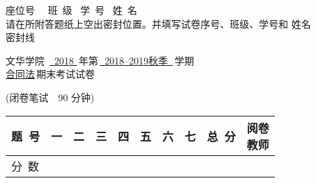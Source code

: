 \documentclass[twocolumn,landscape,UTF8]{ctexart}
\newcommand{\putzdx}{\marginpar{
		\parbox{1cm}{\vspace{-1.6cm}
			\rotatebox[origin=c]{90}{
				\usebox{\zdx}
		}}
}}
\begin{document}
\fancyhf{}
\sbox{\zdx}
{\parbox{27cm}{\centering
	座位号~\underline{\makebox[34mm][c]{}}~ 班~级\underline{\makebox[34mm][c]{}}~ 学~号\underline{\makebox[44mm][c]{}}~ 姓~名\underline{\makebox[34mm][c]{}} ~\\
	\vspace{3mm}
请在所附答题纸上空出密封位置。并填写试卷序号、班级、学号和 姓名\\
\vspace{1mm}
\dotfill{} 密\dotfill{}封\dotfill{}线\dotfill{} \\
	}}
	\reversemarginpar
	
\begin{spacing}{1.25}
	\begin{center}
\begin{LARGE}
文华学院~\underline{~2018 }\,年第\,\underline{~2018--2019秋季~}\,学期\\
\underline{合同法}\,期末考试试卷\\
\end{LARGE}
(闭卷笔试\ \ 90 分钟)\\
	\vspace{0.5cm}
\begin{tabular}{|m{}|*{8}{m{}|}p{}|}
	\hline
\centering  题~号 & \centering 一 & \centering 二 & \centering 三 & \centering 四& \centering 五 & \centering 六 & \centering 七 %
& \centering 总~分 & \makecell{阅卷\\教师} \rule{0pt}{3mm} \\
	\hline
	\centering 分~数 &  &  &  &  &  &  &  &  &  %
	\rule{0pt}{8mm} \\\hline
\end{tabular}
\end{center}
\end{spacing}
\vspace{-0.5cm}
\setlength{\marginparsep}{1.7cm}
\putzdx %
\vspace{1cm}
\end{document}
